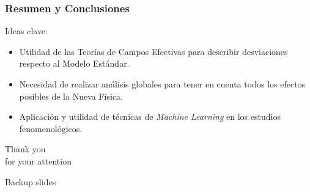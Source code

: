 \documentclass[mathserif, 10pt, dvipsnames]{beamer}
\begin{document}
\begin{frame}\frametitle{Resumen y Conclusiones}

    Ideas clave:

    \vspace{0.5cm}

    \begin{itemize}
        \item Utilidad de las Teorías de Campos Efectivas para describir desviaciones respecto al Modelo Estándar.
\item Necesidad de realizar análisis globales para tener en cuenta todos los efectos posibles de la Nueva Física.
\item Aplicación y utilidad de técnicas de \textit{Machine Learning} en los estudios fenomenológicos.
\end{itemize}
\end{frame}

\appendix

\begin{frame}
    \begin{center}
        {\huge \color{unizarblue} Thank you\\ for your attention}
    \end{center}
\end{frame}

\begin{frame}
    \begin{block}{\huge Backup slides}

    \end{block}
\end{frame}
\end{document}
